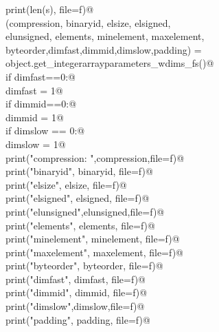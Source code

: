 \documentclass[10pt,a4paper,twoside,notitlepage]{article}
\begin{document}
\begin{flushleft}
\begin{minipage}{\linewidth}
\begin{list}{}{}
\mbox{}\verb@                    print(len(s), file=f)@\\
\mbox{}\verb@                    (compression, binaryid, elsize, elsigned, \@\\
\mbox{}\verb@                        elunsigned, elements, minelement, maxelement, \@\\
\mbox{}\verb@                        byteorder,dimfast,dimmid,dimslow,padding) = \@\\
\mbox{}\verb@                        object.get_integerarrayparameters_wdims_fs()@\\
\mbox{}\verb@                    if dimfast==0:@\\
\mbox{}\verb@                        dimfast = 1@\\
\mbox{}\verb@                    if dimmid==0:@\\
\mbox{}\verb@                        dimmid = 1@\\
\mbox{}\verb@                    if dimslow == 0:@\\
\mbox{}\verb@                        dimslow = 1@\\
\mbox{}\verb@                    print("compression: ",compression,file=f)@\\
\mbox{}\verb@                    print("binaryid", binaryid, file=f)@\\
\mbox{}\verb@                    print("elsize", elsize, file=f)@\\
\mbox{}\verb@                    print("elsigned", elsigned, file=f)@\\
\mbox{}\verb@                    print("elunsigned",elunsigned,file=f)@\\
\mbox{}\verb@                    print("elements", elements, file=f)@\\
\mbox{}\verb@                    print("minelement", minelement, file=f)@\\
\mbox{}\verb@                    print("maxelement", maxelement, file=f)@\\
\mbox{}\verb@                    print("byteorder", byteorder, file=f)@\\
\mbox{}\verb@                    print("dimfast", dimfast, file=f)@\\
\mbox{}\verb@                    print("dimmid", dimmid, file=f)@\\
\mbox{}\verb@                    print("dimslow",dimslow,file=f)@\\
\mbox{}\verb@                    print("padding", padding, file=f)@\\

\end{list}
\end{minipage}
\end{flushleft}
\end{document}
